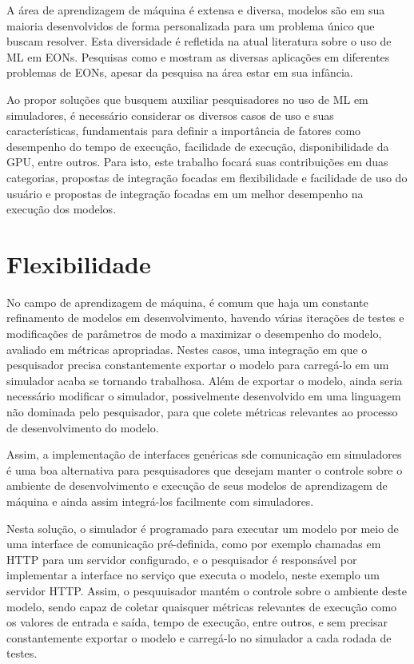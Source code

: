 A área de aprendizagem de máquina é extensa e diversa, modelos são em sua maioria desenvolvidos de forma personalizada para um problema único que buscam resolver. Esta diversidade é refletida na atual literatura sobre o uso de ML em EONs. Pesquisas como \cite{eon_ml_survey_2020} e \cite{8527529} mostram as diversas aplicações em diferentes problemas de EONs, apesar da pesquisa na área estar em sua infância.

Ao propor soluções que busquem auxiliar pesquisadores no uso de ML em simuladores, é necessário considerar os diversos casos de uso e suas características, fundamentais para definir a importância de fatores como desempenho do tempo de execução, facilidade de execução, disponibilidade da GPU, entre outros. Para isto, este trabalho focará suas contribuições em duas categorias, propostas de integração focadas em flexibilidade e facilidade de uso do usuário e propostas de integração focadas em um melhor desempenho na execução dos modelos.

\section{Flexibilidade}

No campo de aprendizagem de máquina, é comum que haja um constante refinamento de modelos em desenvolvimento, havendo várias iterações de testes e modificações de parâmetros de modo a maximizar o desempenho do modelo, avaliado em métricas apropriadas. Nestes casos, uma integração em que o pesquisador precisa constantemente exportar o modelo para carregá-lo em um simulador acaba se tornando trabalhosa. Além de exportar o modelo, ainda seria necessário modificar o simulador, possivelmente desenvolvido em uma linguagem não dominada pelo pesquisador, para que colete métricas relevantes ao processo de desenvolvimento do modelo.

Assim, a implementação de interfaces genéricas sde comunicação em simuladores é uma boa alternativa para pesquisadores que desejam manter o controle sobre o ambiente de desenvolvimento e execução de seus modelos de aprendizagem de máquina e ainda assim integrá-los facilmente com simuladores.

Nesta solução, o simulador é programado para executar um modelo por meio de uma interface de comunicação pré-definida, como por exemplo chamadas em HTTP para um servidor configurado, e o pesquisador é responsável por implementar a interface no serviço que executa o modelo, neste exemplo um servidor HTTP. Assim, o pesquuisador mantém o controle sobre o ambiente deste modelo, sendo capaz de coletar quaisquer métricas relevantes de execução como os valores de entrada e saída, tempo de execução, entre outros, e sem precisar constantemente exportar o modelo e carregá-lo no simulador a cada rodada de testes.

